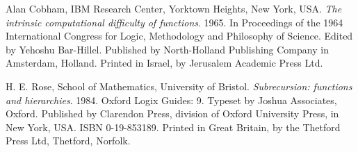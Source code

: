 \begin{thebibliography}{9} %


Alan Cobham, IBM Research Center, Yorktown Heights, New York, USA. \emph{The
intrinsic computational difficulty of functions}. 1965. In Proceedings of the
1964 International Congress for Logic, Methodology and Philosophy of Science.
Edited by Yehoshu Bar-Hillel. Published by North-Holland Publishing Company in
Amsterdam, Holland.  Printed in Israel, by Jerusalem Academic Press Ltd.


H. E. Rose, School of Mathematics, University of Bristol. \emph{Subrecursion:
functions and hierarchies}. 1984. Oxford Logix Guides: 9. Typeset by Joshua
Associates, Oxford.  Published by Clarendon Press, division of Oxford
University Press, in New York, USA. ISBN 0-19-853189. Printed in Great Britain,
by the Thetford Press Ltd, Thetford, Norfolk.

\end{thebibliography}
